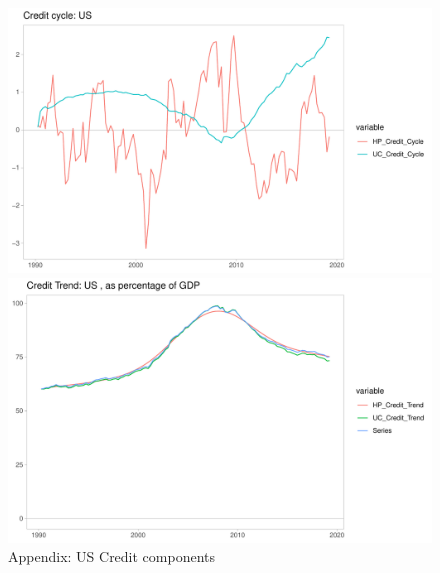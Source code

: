 \documentclass[fleqn]{article}
\begin{document}
\begin{outline}[enumerate]
\begin{figure}[h!]
	\caption{Appendix: US Credit components}	
	\centerline{\includegraphics[scale=0.7]{../../VAR_2_notrendcovar/Output/Graphs/Credit_cycle_US.pdf}}
	\centerline{\includegraphics[scale=0.7]{../../VAR_2_notrendcovar/Output/Graphs/Credit_trend_US.pdf}}
\end{figure}


\end{outline}
\end{document}

